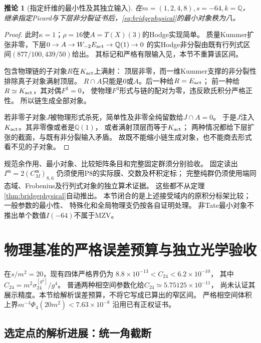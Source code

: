 \documentclass[11pt,a4paper]{ctexart}
\theoremstyle{cnplain}\newtheorem{theorem}{定理}[section]
\newtheorem{corollary}[theorem]{推论}
\theoremstyle{definition}\newtheorem{definition}[theorem]{定义}
\theoremstyle{remark}\newtheorem{remark}[theorem]{注}
\begin{document}
\begin{corollary}[指定纤维的最小性及其独立输入]\label{cor:bridgeminimal}
在$m=(1,2,4,8),s=-64,k=\mathbb Q$，
继承指定Picard与下层非分裂证书后，\eqref{eq:bridgephysical}的最小对象秩为八。
\end{corollary}
\begin{proof}
此时$\kappa=1$；$\rho=16$使$A=T(X)(3)$的Hodge实现简单。
质量Kummer扩张非零，下层$0\to A\to W_{-2}E_{\rm act}\to\mathbb Q(1)\to0$
的实Hodge非分裂由既有行列式区间$(877/100,439/50)$给出。
其标记和严格有限输入见\cite{BridgeAudit}，本节不重算该区间。

包含物理链的子对象$R$在$K_{\rm act}$上满射：
顶层非零，而一维Kummer支撑的非分裂性排除真子对象满射顶层。
$R\cap A$只能是$0$或$A$。后一种给$R=E_{\rm act}$；
前一种给$R\simeq K_{\rm act}$，其对偶$F^3=0$，
使物理$F^3$形式与链的配对为零，违反欧氏积分严格正性。
所以链生成全部对象。

若非零子对象$J$被物理形式杀死，简单性及非零全纯留数给$J\cap A=0$。
于是$J$注入$K_{\rm act}$。其非零像或者是$\mathbb Q(1)$，
或者满射顶层而等于$K_{\rm act}$；
两种情况都给下层扩张的截面，与既有非分裂输入矛盾。
故既不能缩小链生成对象，也不能商去形式看不见的子对象。
\end{proof}

规范余作用、最小对象、比较矩阵条目和完整固定群须分别验收。
固定读出$I^{\mathfrak m}=2(C_M^{\mathfrak m})_{8,6}$
仍须使用P8的实际膜、交数及杯积定标；
完整纯群仍须使用端同态域、Frobenius及行列式对象的独立算术证据。
这些都不从定理\ref{thm:bridgephysical}自动推出。
本节闭合的是上述接受域内的原积分标架比较；一般参数的最小性、
特殊化和全局物理支仍按各自证明处理。
非Tate最小对象不推出单个数值$I(-64)$不属于MZV。


\section{物理基准的严格误差预算与独立光学验收}\label{sec:narrowphysics}
在$s/m^2=20$，现有四体严格界仍为
$8.8\times10^{-13}<C_{24}<6.2\times10^{-10}$，
其中$C_{24}=m^2\sigma_{24}^{[g^4]}/g^4$。
普通两种相空间参数化给$C_{24}\simeq5.75125\times10^{-11}$，
尚未认证其展示精度。本节给解析误差预算，不将它写成已算出的窄区间。
严格相空间体积上界$m^{-4}\Phi_4(20m^2)<7.63\times10^{-8}$
沿用已有正权证书\cite{BridgePhysics}。

\subsection{选定点的解析进展：统一角截断}
\end{document}
